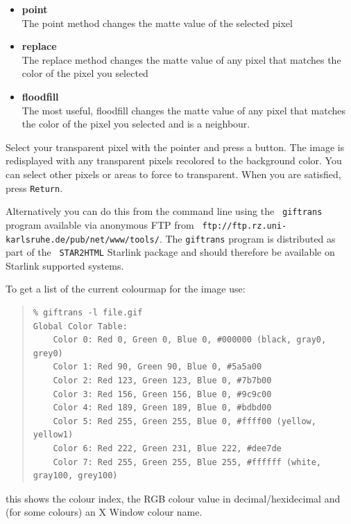\documentclass[twoside,11pt]{article}
\newcommand{\htmladdnormallink}[2]{#1}
\newcommand{\latex}[1]{#1}
\begin{document}
\begin{itemize}
\item{{\bf point}}\\
The point method changes the matte value of the selected pixel
\item{{\bf replace}}\\
The replace method changes the matte value of any pixel that matches
the color of the pixel you selected
\item{{\bf floodfill}}\\
The most useful, floodfill changes the matte value of any pixel that
matches the color of the pixel you selected and is a neighbour.
\end{itemize}

Select your transparent pixel with the pointer and press a button. The
image is redisplayed with any transparent pixels recolored to the
background color. You can select other pixels or areas to force to
transparent. When you are satisfied, press {\tt Return}.

Alternatively you can do this from the command line using the
\htmladdnormallink{{\tt
giftrans}}{ftp://ftp.rz.uni-karlsruhe.de/pub/net/www/tools/}
program\latex{ available via anonymous FTP from
\htmladdnormallink{{\tt
ftp://ftp.rz.uni-karlsruhe.de/pub/net/www/tools/}}{ftp://ftp.rz.uni-karlsruhe.de/pub/net/www/tools/}}.
The {\tt giftrans} program is distributed as part of the {\tt
STAR2HTML} Starlink package and should therefore be available on
Starlink supported systems.

To get a list of the current colourmap for the image use:

\small
\begin{quote}
\begin{verbatim}
% giftrans -l file.gif
Global Color Table:
    Color 0: Red 0, Green 0, Blue 0, #000000 (black, gray0, grey0)
    Color 1: Red 90, Green 90, Blue 0, #5a5a00
    Color 2: Red 123, Green 123, Blue 0, #7b7b00
    Color 3: Red 156, Green 156, Blue 0, #9c9c00
    Color 4: Red 189, Green 189, Blue 0, #bdbd00
    Color 5: Red 255, Green 255, Blue 0, #ffff00 (yellow, yellow1)
    Color 6: Red 222, Green 231, Blue 222, #dee7de
    Color 7: Red 255, Green 255, Blue 255, #ffffff (white, gray100, grey100)
\end{verbatim}
\end{quote}
\normalsize

this shows the colour index, the RGB colour value in
decimal/hexidecimal and (for some colours) an X Window colour name.
\end{document}
